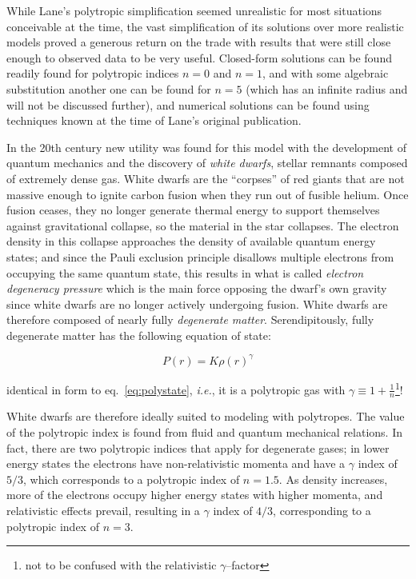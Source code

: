 \documentclass[twoside]{article}
\begin{document}
\begin{multicols}{2}
While Lane's polytropic simplification seemed unrealistic for most situations
conceivable at the time, the vast simplification of its solutions over more
realistic models proved a generous return on the trade with results that were
still close enough to observed data to be very useful. Closed-form
solutions\cite{leblanc2010} can be found readily found for polytropic indices
\(n=0\) and \(n=1\), and with some algebraic substitution another one can be
found for \(n=5\) (which has an infinite radius and will not be discussed
further), and numerical solutions can be found using techniques known at the
time of Lane's original publication.

In the 20th century new utility was found for this model with the development of
quantum mechanics and the discovery of \emph{white dwarfs}, stellar remnants
composed of extremely dense gas. White dwarfs are the ``corpses'' of red giants
that are not massive enough to ignite carbon fusion when they run out of fusible
helium. Once fusion ceases, they no longer generate thermal energy to support
themselves against gravitational collapse, so the material in the star
collapses. The electron density in this collapse approaches the density of
available quantum energy states; and since the Pauli exclusion principle
disallows multiple electrons from occupying the same quantum
state\cite[p.216]{griffithsqm}, this results in what is called \emph{electron
degeneracy pressure} which is the main force opposing the dwarf's own gravity
since white dwarfs are no longer actively undergoing
fusion.\cite[pp.163--166]{hansen2004} White dwarfs are therefore composed of
nearly fully \emph{degenerate matter}. Serendipitously, fully degenerate matter
has the following equation of state:

    \begin{equation}
        \label{eq:degenstate}
        P(r)=K\rho(r)^{\gamma}
    \end{equation}

identical in form to eq.~\ref{eq:polystate}, \emph{i.e.}, it is a polytropic gas
with \(\gamma\equiv 1+\frac{1}{n}\)\footnote{not to be confused with the
relativistic \(\gamma\)--factor}!

White dwarfs are therefore ideally suited to modeling with polytropes. The
value of the polytropic index is found from fluid and quantum mechanical
relations. In fact, there are two polytropic indices that apply for degenerate
gases; in lower energy states the electrons have non-relativistic momenta and
have a \(\gamma\) index of \(5/3\), which corresponds to a polytropic index of
\(n=1.5\). As density increases, more of the electrons occupy higher energy
states with higher momenta, and relativistic effects prevail, resulting in a
\(\gamma\) index of \(4/3\), corresponding to a polytropic index of \(n=3\). 



\end{multicols}
\end{document}
